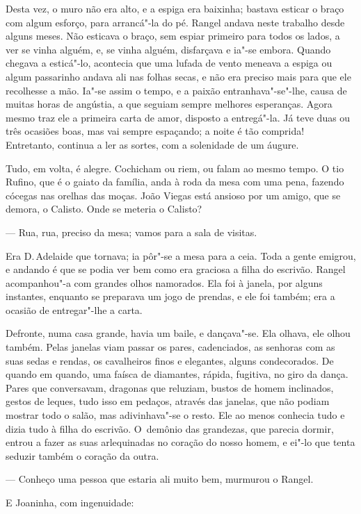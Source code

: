 \begin{linenumbers}
Desta vez, o muro não era alto, e a espiga era baixinha; bastava esticar
o braço com algum esforço, para arrancá"-la do pé. Rangel andava neste
trabalho desde alguns meses. Não esticava o braço, sem espiar primeiro
para todos os lados, a ver se vinha alguém, e, se vinha alguém,
disfarçava e ia"-se embora. Quando chegava a esticá"-lo, acontecia que uma
lufada de vento meneava a espiga ou algum passarinho andava ali nas
folhas secas, e não era preciso mais para que ele recolhesse a mão.
Ia"-se assim o tempo, e a paixão entranhava"-se"-lhe, causa de muitas horas
de angústia, a que seguiam sempre melhores esperanças. Agora mesmo traz
ele a primeira carta de amor, disposto a entregá"-la. Já teve duas ou
três ocasiões boas, mas vai sempre espaçando; a noite é tão comprida!
Entretanto, continua a ler as sortes, com a solenidade de um áugure.

Tudo, em volta, é alegre. Cochicham ou riem, ou falam ao mesmo tempo. O
tio Rufino, que é o gaiato da família, anda à roda da mesa com uma pena,
fazendo cócegas nas orelhas das moças. João Viegas está ansioso por um
amigo, que se demora, o Calisto. Onde se meteria o Calisto?

--- Rua, rua, preciso da mesa; vamos para a sala de visitas.

Era D.\,Adelaide que tornava; ia pôr"-se a mesa para a ceia. Toda a gente
emigrou, e andando é que se podia ver bem como era graciosa a filha do
escrivão. Rangel acompanhou"-a com grandes olhos namorados. Ela foi à
janela, por alguns instantes, enquanto se preparava um jogo de prendas,
e ele foi também; era a ocasião de entregar"-lhe a carta.

Defronte, numa casa grande, havia um baile, e dançava"-se. Ela olhava,
ele olhou também. Pelas janelas viam passar os pares, cadenciados, as
senhoras com as suas sedas e rendas, os cavalheiros finos e elegantes,
alguns condecorados. De quando em quando, uma faísca de diamantes,
rápida, fugitiva, no giro da dança. Pares que conversavam, dragonas que
reluziam, bustos de homem inclinados, gestos de leques, tudo isso em
pedaços, através das janelas, que não podiam mostrar todo o salão, mas
adivinhava"-se o resto. Ele ao menos conhecia tudo e dizia tudo à filha
do escrivão. O~demônio das grandezas, que parecia dormir, entrou a fazer
as suas arlequinadas no coração do nosso homem, e ei"-lo que tenta
seduzir também o coração da outra.

--- Conheço uma pessoa que estaria ali muito bem, murmurou o Rangel.

E Joaninha, com ingenuidade:


\end{linenumbers}
